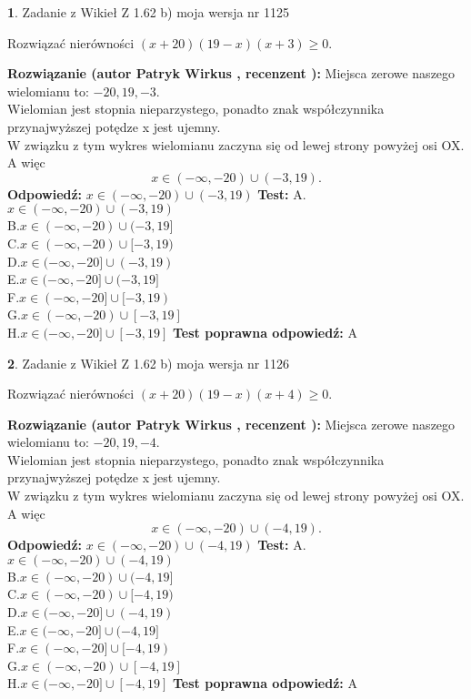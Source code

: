 \documentclass[12pt, a4paper]{article}
\theoremstyle{definition} %
\newtheorem{zad}{}
\newcommand{\zadStart}[1]{\begin{zad}#1\newline}
\newcommand{\zadStop}{\end{zad}}
\newcommand{\rozwStart}[2]{\noindent \textbf{Rozwiązanie (autor #1 , recenzent #2): }\newline}
\newcommand{\rozwStop}{\newline}
\newcommand{\odpStart}{\noindent \textbf{Odpowiedź:}\newline}
\newcommand{\odpStop}{\newline}
\newcommand{\testStart}{\noindent \textbf{Test:}\newline}
\newcommand{\testStop}{\newline}
\newcommand{\kluczStart}{\noindent \textbf{Test poprawna odpowiedź:}\newline}
\newcommand{\kluczStop}{\newline}
\begin{document}
\zadStart{Zadanie z Wikieł Z 1.62 b) moja wersja nr 1125}

Rozwiązać nierówności $(x+20)(19-x)(x+3)\ge0$.
\zadStop
\rozwStart{Patryk Wirkus}{}
Miejsca zerowe naszego wielomianu to: $-20, 19, -3$.\\
Wielomian jest stopnia nieparzystego, ponadto znak współczynnika przy\linebreak najwyższej potędze x jest ujemny.\\ W związku z tym wykres wielomianu zaczyna się od lewej strony powyżej osi OX. A więc $$x \in (-\infty,-20) \cup (-3,19).$$
\rozwStop
\odpStart
$x \in (-\infty,-20) \cup (-3,19)$
\odpStop
\testStart
A.$x \in (-\infty,-20) \cup (-3,19)$\\
B.$x \in (-\infty,-20) \cup (-3,19]$\\
C.$x \in (-\infty,-20) \cup [-3,19)$\\
D.$x \in (-\infty,-20] \cup (-3,19)$\\
E.$x \in (-\infty,-20] \cup (-3,19]$\\
F.$x \in (-\infty,-20] \cup [-3,19)$\\
G.$x \in (-\infty,-20) \cup [-3,19]$\\
H.$x \in (-\infty,-20] \cup [-3,19]$
\testStop
\kluczStart
A
\kluczStop



\zadStart{Zadanie z Wikieł Z 1.62 b) moja wersja nr 1126}

Rozwiązać nierówności $(x+20)(19-x)(x+4)\ge0$.
\zadStop
\rozwStart{Patryk Wirkus}{}
Miejsca zerowe naszego wielomianu to: $-20, 19, -4$.\\
Wielomian jest stopnia nieparzystego, ponadto znak współczynnika przy\linebreak najwyższej potędze x jest ujemny.\\ W związku z tym wykres wielomianu zaczyna się od lewej strony powyżej osi OX. A więc $$x \in (-\infty,-20) \cup (-4,19).$$
\rozwStop
\odpStart
$x \in (-\infty,-20) \cup (-4,19)$
\odpStop
\testStart
A.$x \in (-\infty,-20) \cup (-4,19)$\\
B.$x \in (-\infty,-20) \cup (-4,19]$\\
C.$x \in (-\infty,-20) \cup [-4,19)$\\
D.$x \in (-\infty,-20] \cup (-4,19)$\\
E.$x \in (-\infty,-20] \cup (-4,19]$\\
F.$x \in (-\infty,-20] \cup [-4,19)$\\
G.$x \in (-\infty,-20) \cup [-4,19]$\\
H.$x \in (-\infty,-20] \cup [-4,19]$
\testStop
\kluczStart
A
\kluczStop
\end{document}
